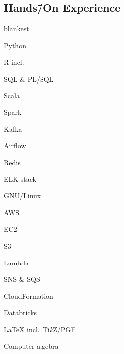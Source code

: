 \documentclass[%
version=last,%
fontsize=11pt,%
paper=A4,%
headinclude=false,%
footinclude=false,%
headlines=0,%
footlines=0,%
areasetadvanced,%
toc=bibnumbered,%
]{scrartcl}%
\begin{document}
\begin{minipage}[t]{.4\textwidth}
  \subsection{%
    \texorpdfstring%
    {Hands\=/On Experience}%
    {Hands-On Experience}%
  }%
  \label{sec:hands-on-experience}

  \begin{UniformTCBRaster}{2}
    \begin{tcboxedraster}[raster columns=1]{blankest}
      \begin{TCBItems}
      \item Python
      \item R incl.\ 
      \item SQL \& PL/SQL
      \item Scala
      \end{TCBItems}
      \begin{tcolorbox}
        \begin{minipage}[t]{0.45\linewidth}
          \begin{Items}
          \item Spark
          \item Kafka
          \item Airflow
          \end{Items}
        \end{minipage}%
        \hfill%
        \begin{minipage}[t]{0.55\linewidth}
          \begin{Items}
          \item Redis
          \item ELK stack
          \end{Items}
        \end{minipage}
      \end{tcolorbox}
    \end{tcboxedraster}
    \begin{TCBItems}
    \item GNU/Linux
    \item AWS
      \begin{Items}
      \item EC2
      \item S3
      \item Lambda
      \item SNS \& SQS
      \item CloudFormation
      \end{Items}
    \item Databricks
    \end{TCBItems}
    \begin{tcolorbox}
      \LaTeX{} incl.\ Ti\emph{k}Z/PGF
    \end{tcolorbox}
    \begin{tcolorbox}
      Computer algebra
    \end{tcolorbox}
  \end{UniformTCBRaster}


\end{minipage}
\end{document}
